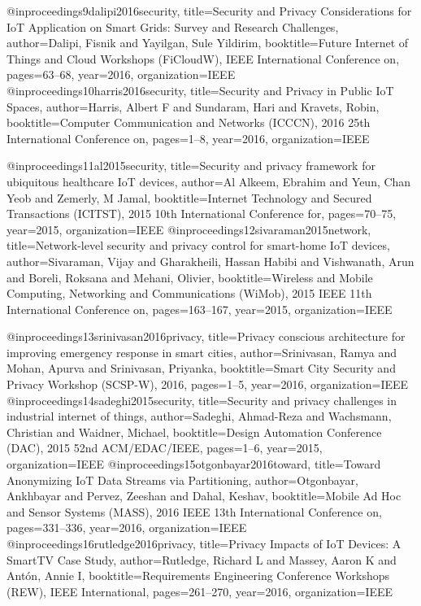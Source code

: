 {{{{@inproceedings{9dalipi2016security,
	title={Security and Privacy Considerations for {I}o{T} Application on Smart Grids: Survey and Research Challenges},
	author={Dalipi, Fisnik and Yayilgan, Sule Yildirim},
	booktitle={Future Internet of Things and Cloud Workshops (FiCloudW), IEEE International Conference on},
	pages={63--68},
	year={2016},
	organization={IEEE}
}
@inproceedings{10harris2016security,
	title={Security and Privacy in Public {I}o{T} Spaces},
	author={Harris, Albert F and Sundaram, Hari and Kravets, Robin},
	booktitle={Computer Communication and Networks (ICCCN), 2016 25th International Conference on},
	pages={1--8},
	year={2016},
	organization={IEEE}
}

@inproceedings{11al2015security,
	title={Security and privacy framework for ubiquitous healthcare {I}o{T} devices},
	author={Al Alkeem, Ebrahim and Yeun, Chan Yeob and Zemerly, M Jamal},
	booktitle={Internet Technology and Secured Transactions (ICITST), 2015 10th International Conference for},
	pages={70--75},
	year={2015},
	organization={IEEE}
}
@inproceedings{12sivaraman2015network,
	title={Network-level security and privacy control for smart-home {I}o{T} devices},
	author={Sivaraman, Vijay and Gharakheili, Hassan Habibi and Vishwanath, Arun and Boreli, Roksana and Mehani, Olivier},
	booktitle={Wireless and Mobile Computing, Networking and Communications (WiMob), 2015 IEEE 11th International Conference on},
	pages={163--167},
	year={2015},
	organization={IEEE}
}

@inproceedings{13srinivasan2016privacy,
	title={Privacy conscious architecture for improving emergency response in smart cities},
	author={Srinivasan, Ramya and Mohan, Apurva and Srinivasan, Priyanka},
	booktitle={Smart City Security and Privacy Workshop (SCSP-W), 2016},
	pages={1--5},
	year={2016},
	organization={IEEE}
}
@inproceedings{14sadeghi2015security,
	title={Security and privacy challenges in industrial internet of things},
	author={Sadeghi, Ahmad-Reza and Wachsmann, Christian and Waidner, Michael},
	booktitle={Design Automation Conference (DAC), 2015 52nd ACM/EDAC/IEEE},
	pages={1--6},
	year={2015},
	organization={IEEE}
}
@inproceedings{15otgonbayar2016toward,
	title={Toward Anonymizing {I}o{T} Data Streams via Partitioning},
	author={Otgonbayar, Ankhbayar and Pervez, Zeeshan and Dahal, Keshav},
	booktitle={Mobile Ad Hoc and Sensor Systems (MASS), 2016 IEEE 13th International Conference on},
	pages={331--336},
	year={2016},
	organization={IEEE}
}
@inproceedings{16rutledge2016privacy,
	title={Privacy Impacts of {I}o{T} Devices: A SmartTV Case Study},
	author={Rutledge, Richard L and Massey, Aaron K and Ant{\'o}n, Annie I},
	booktitle={Requirements Engineering Conference Workshops (REW), IEEE International},
	pages={261--270},
	year={2016},
	organization={IEEE}
}

}}}}
